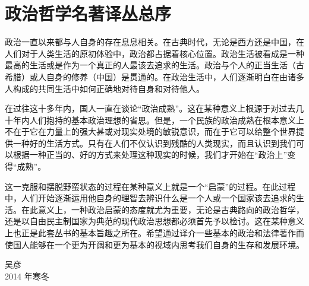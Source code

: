 \chapter*{政治哲学名著译丛总序}

政治一直以来都与人自身的存在息息相关。在古典时代，无论是西方还是中国，在人们对于人类生活的原初体验中，政治都占据着核心位置。政治生活被看成是一种最高的生活或是作为一个真正的人最该去追求的生活。政治与个人的正当生活（古希腊）或人自身的修养（中国）是贯通的。在政治生活中，人们逐渐明白在由诸多人构成的共同生活中如何正确地对待自身和对待他人。

在过往这十多年内，国人一直在谈论“政治成熟”。这在某种意义上根源于对过去几十年内人们抱持的基本政治理想的省思。但是，一个民族的政治成熟在根本意义上不在于它在力量上的强大甚或对现实处境的敏锐意识，而在于它可以给整个世界提供一种好的生活方式。只有在人们不仅认识到残酷的人类现实，而且认识到我们可以根据一种正当的、好的方式来处理这种现实的时候，我们才开始在“政治上”变得“成熟”。

这一克服和摆脱野蛮状态的过程在某种意义上就是一个“启蒙”的过程。在此过程中，人们开始逐渐运用他自身的理智去辨识什么是一个人或一个国家该去追求的生活。在此意义上，一种政治启蒙的态度就尤为重要，无论是古典路向的政治哲学，还是以自由民主制国家为典范的现代政治思想都必须首先予以检讨。这在某种意义上也正是此套丛书的基本旨趣之所在。希望通过译介一些基本的政治和法律著作而使国人能够在一个更为开阔和更为基本的视域内思考我们自身的生存和发展环境。

\begin{flushright}
吴彦\\
2014 年寒冬
\end{flushright}